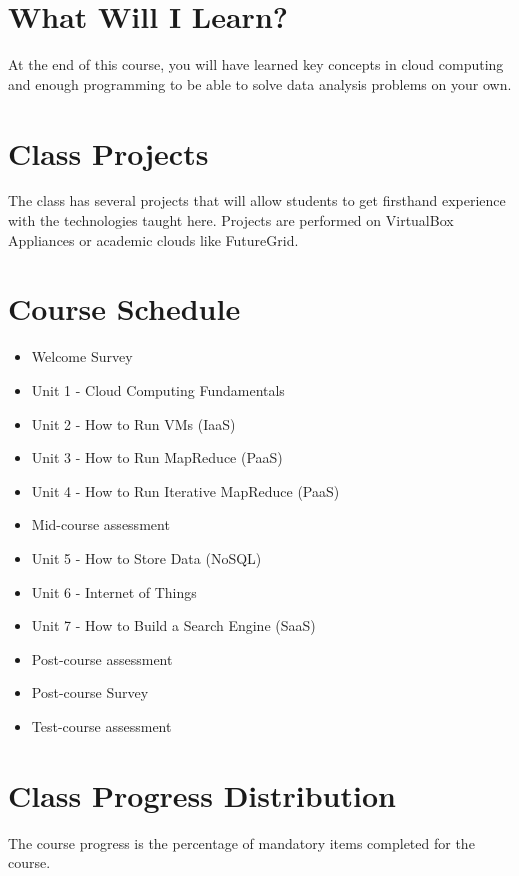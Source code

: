 \section{What Will I Learn?}

At the end of this course, you will have learned key concepts in cloud
computing and enough programming to be able to solve data analysis
problems on your own.

\section{Class Projects}

The class has several projects that will allow students to get
firsthand experience with the technologies taught here. Projects are
performed on VirtualBox Appliances or academic clouds like FutureGrid.

\section{Course Schedule}



\begin{itemize}
  \item Welcome Survey
  \item Unit 1 - Cloud Computing Fundamentals
  \item Unit 2 - How to Run VMs (IaaS)
  \item Unit 3 - How to Run MapReduce (PaaS)
  \item Unit 4 - How to Run Iterative MapReduce (PaaS)
  \item Mid-course assessment
  \item Unit 5 - How to Store Data (NoSQL)
  \item Unit 6 - Internet of Things
  \item Unit 7 - How to Build a Search Engine (SaaS)
  \item Post-course assessment
  \item Post-course Survey
  \item Test-course assessment
\end{itemize}

\section{Class Progress Distribution}

The course progress is the percentage of mandatory items completed for
the course.


